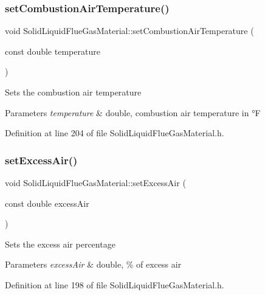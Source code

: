 \subsubsection{\texorpdfstring{set\+Combustion\+Air\+Temperature()}{setCombustionAirTemperature()}}
{\footnotesize\ttfamily void Solid\+Liquid\+Flue\+Gas\+Material\+::set\+Combustion\+Air\+Temperature (\begin{DoxyParamCaption}\item[{const double}]{temperature }\end{DoxyParamCaption})\hspace{0.3cm}{\ttfamily [inline]}}

Sets the combustion air temperature 
\begin{DoxyParams}{Parameters}
{\em temperature} & double, combustion air temperature in °F \\
\hline
\end{DoxyParams}


Definition at line 204 of file Solid\+Liquid\+Flue\+Gas\+Material.\+h.

\mbox{\label{class_solid_liquid_flue_gas_material_a7a3f9f77d267afc05f5fde1da9329ec5}} 
\subsubsection{\texorpdfstring{set\+Excess\+Air()}{setExcessAir()}}
{\footnotesize\ttfamily void Solid\+Liquid\+Flue\+Gas\+Material\+::set\+Excess\+Air (\begin{DoxyParamCaption}\item[{const double}]{excess\+Air }\end{DoxyParamCaption})\hspace{0.3cm}{\ttfamily [inline]}}

Sets the excess air percentage 
\begin{DoxyParams}{Parameters}
{\em excess\+Air} & double, \% of excess air \\
\hline
\end{DoxyParams}


Definition at line 198 of file Solid\+Liquid\+Flue\+Gas\+Material.\+h.

\mbox{\label{class_solid_liquid_flue_gas_material_ae647700dbff5ccea7938b2117f2c3156}} 
